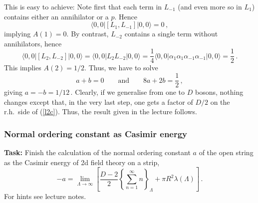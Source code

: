 \documentclass[12pt]{article}
\newcommand{\be}{\begin{equation}}
\newcommand{\ee}{\end{equation}}
\numberwithin{equation}{section}
\begin{document}
This is easy to achieve: Note first that each term in $L_{-1}$ (and even more so in $L_1$) contains either an annihilator or a $p$. Hence
\be
\langle 0,0|[L_1,L_{-1}]|0,0\rangle=0\,,
\ee
implying $A(1)=0$. By contrast, $L_{-2}$ contains a single term without annihilators, hence
\be
\langle 0,0|[L_2,L_{-2}]|0,0\rangle=\langle 0,0|L_2L_{-2}|0,0\rangle=
\frac{1}{4}\langle 0,0|\alpha_1\alpha_1\alpha_{-1}\alpha_{-1}|0,0\rangle=\frac{1}{2}\,.\label{l2c}
\ee
This implies $A(2)=1/2$. Thus, we have to solve
\be
a+b=0 \qquad \mbox{and}\qquad 8a+2b=\frac{1}{2}\,,
\ee
giving $a=-b=1/12$\,. Clearly, if we generalise from one to $D$ bosons, nothing changes except that, in the very last step, one gets a factor of $D/2$ on the r.h.~side of (\ref{l2c}). Thus, the result given in the lecture follows.






\subsubsection{Normal ordering constant as Casimir energy}\label{noc}

{\bf Task:} Finish the calculation of the normal ordering constant $a$ of the open string as the Casimir energy of 2d field theory on a strip,
\be
-a=\lim_{\Lambda\to\infty}\left[\frac{D-2}{2}\left\{\sum_{n=1}^\infty n\right\}_\Lambda+\pi R^2\lambda(\Lambda)\right]\,.
\ee
For hints see lecture notes.
\end{document}
